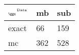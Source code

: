 \begin{tabular}{lll}
    \toprule
    $_{\text{\tiny{\ggn}}}$$^{\text{\tiny{Data}}}$ & mb & sub \\
    \midrule
    exact & 66
              & 159 \\
    mc   & 362
              & 528 \\
    \bottomrule
\end{tabular}